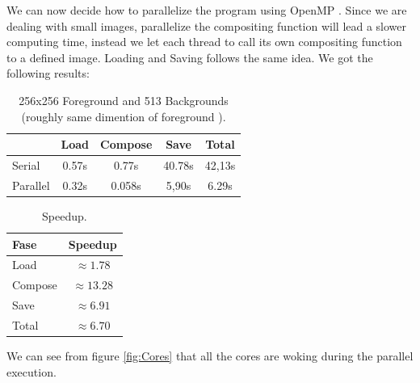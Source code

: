 \documentclass[10pt,twocolumn,letterpaper,english]{article}
\begin{document}
We can now decide how to parallelize the program using OpenMP \cite{openmp}.
Since we are dealing with small images, parallelize the compositing function will lead a slower computing time, instead we let each thread to call its own compositing function to a defined image. Loading and Saving follows the same idea.
We got the following results:
\begin{table}[htbp]
	\centering
	\begin{tabular}{|l|c|c|c|c|}
		\hline
		& Load & Compose & Save & Total\\
		\hline
		Serial & 0.57s & 0.77s & 40.78s & 42,13s\\
		Parallel & 0.32s & 0.058s & 5,90s & 6.29s\\
		\hline
	\end{tabular}
	\caption{256x256 Foreground and 513 Backgrounds (roughly same dimention of foreground ).}
	\label{tab:Mesurements}
\end{table}
\begin{table}[htbp]
	\centering
	\begin{tabular}{|l|c|}
		\hline
		Fase & Speedup \\
		\hline
		Load & $ \approx 1.78$ \\
		Compose & $ \approx 13.28$ \\
		Save & $\approx 6.91$ \\
		Total & $\approx 6.70$ \\
		\hline
	\end{tabular}
	\caption{Speedup.}
	\label{tab:Speedup}
\end{table}
We can see from figure \ref*{fig:Cores} that all the cores are woking during the parallel execution.



{\small


}
\end{document}
